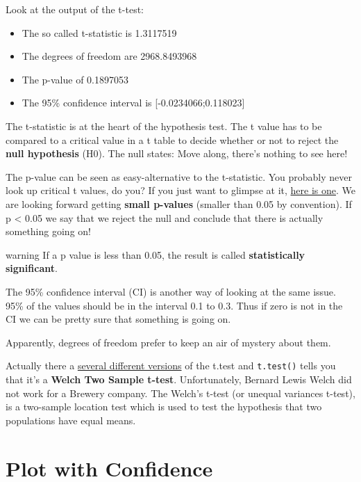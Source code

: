 \documentclass[
]{book}
\providecommand{\tightlist}{%
  \setlength{\itemsep}{0pt}\setlength{\parskip}{0pt}}
\begin{document}
Look at the output of the t-test:

\begin{itemize}
\tightlist
\item
  The so called t-statistic is 1.3117519
\item
  The degrees of freedom are 2968.8493968
\item
  The p-value of 0.1897053
\item
  The 95\% confidence interval is {[}-0.0234066;0.118023{]}
\end{itemize}

The t-statistic is at the heart of the hypothesis test. The t value has to be compared to a critical value in a t table to decide whether or not to reject the \textbf{null hypothesis} (H0). The null states: Move along, there's nothing to see here!

The p-value can be seen as easy-alternative to the t-statistic. You probably never look up critical t values, do you? If you just want to glimpse at it, \href{https://jimgrange.wordpress.com/2015/12/05/statistics-tables-where-do-the-numbers-come-from/}{here is one}. We are looking forward getting \textbf{small p-values} (smaller than 0.05 by convention). If p \textless{} 0.05 we say that we reject the null and conclude that there is actually something going on!

\begin{infobox2}warning
If a p value is less than 0.05, the result is called \textbf{statistically significant}.

\end{infobox2}

The 95\% confidence interval (CI) is another way of looking at the same issue. 95\% of the values should be in the interval 0.1 to 0.3. Thus if zero is not in the CI we can be pretty sure that something is going on.

Apparently, degrees of freedom prefer to keep an air of mystery about them.

Actually there a \href{https://en.wikipedia.org/wiki/Student\%27s_t-test}{several different versions} of the t.test and \texttt{t.test()} tells you that it's a \textbf{Welch Two Sample t-test}. Unfortunately, Bernard Lewis Welch did not work for a Brewery company. The Welch's t-test (or unequal variances t-test), is a two-sample location test which is used to test the hypothesis that two populations have equal means.

\hypertarget{plot-with-confidence}{%
\section{Plot with Confidence}\label{plot-with-confidence}}
\end{document}
